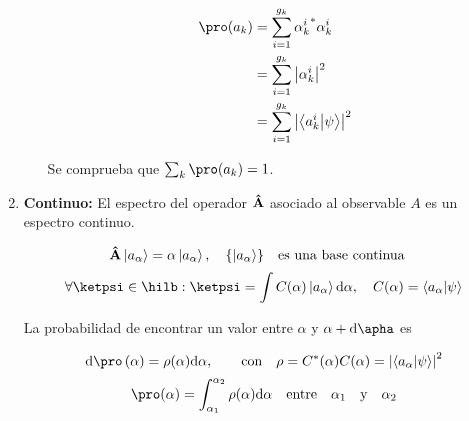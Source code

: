 \begin{enumerate}[\textbf{a)}]
\begin{itemize}
        \begin{align*}
            \pro(a_k)&=\sum_{i=1}^{g_k}{\alpha_k^i}^*\alpha_k^i\\
            &=\sum_{i=1}^{g_k}\abs{\alpha_k^i}^2\\
            &=\sum_{i=1}^{g_k}\abs{\braket{a_k^i}{\psi}}^2
        \end{align*}
        
        Se comprueba que $\sum_k\pro(a_k)=1$.
    \end{itemize}
    
    \item \textbf{Continuo:} El espectro del operador $\vu{A}$ asociado al observable $A$ es un espectro continuo.
    
    $$
        \vu{A}\ket{a_\alpha}=\alpha\ket{a_\alpha}\qc\qty{\ket{a_\alpha}}\qq{es una base continua}
    $$
    $$
            \forall\ketpsi\in\hilb:\ketpsi=\int C(\alpha)\ket{a_\alpha}\dd\alpha \qc C(\alpha)=\braket{a_\alpha}{\psi}
    $$
    
    La probabilidad de encontrar un valor entre $\alpha$ y $\alpha+\dd\apha$ es
    
    $$
        \dd\pro(\alpha)=\rho(\alpha)\dd\alpha\qc\qq{con}\rho=C^*(\alpha)C(\alpha)=\abs{\braket{a_\alpha}{\psi}}^2
    $$
    $$
        \pro(\alpha)=\int_{\alpha_1}^{\alpha_2}\rho(\alpha)\dd\alpha\qq{entre}\alpha_1\qq{y}\alpha_2
    $$
\end{enumerate}

